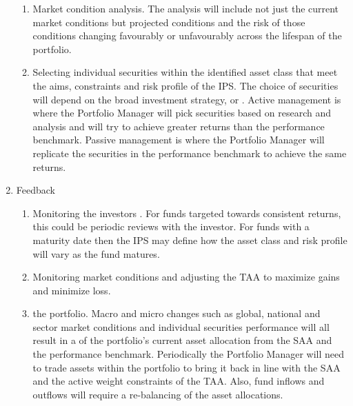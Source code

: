 \documentclass[oneside,12pt]{Classes/RoboticsLaTeX}
\begin{document}
\begin{enumerate}
\begin{enumerate}
    \item Market condition analysis. The analysis will include not just the current market conditions but projected conditions and the risk of those conditions changing favourably or unfavourably across the lifespan of the portfolio. 
    \item Selecting individual securities within the identified asset class that meet the aims, constraints and risk profile of the IPS. The choice of securities will depend on the broad investment strategy,  or . Active management is where the Portfolio Manager will pick securities based on research and analysis and will try to achieve greater returns than the performance benchmark. Passive management is where the Portfolio Manager will replicate the securities in the performance benchmark to achieve the same returns.
    \end{enumerate}
\item Feedback \citep[p.3]{BakerH.Kent2013PTaM}
    \begin{enumerate}
    \item Monitoring the investors . For funds targeted towards consistent returns, this could be periodic reviews with the investor. For funds with a maturity date then the IPS may define how the asset class and risk profile will vary as the fund matures.
    \item Monitoring market conditions and adjusting the TAA to maximize gains and minimize loss.
    \item {} the portfolio.  Macro and micro changes such as global, national and sector market conditions and individual securities performance will all result in a  of the portfolio’s current asset allocation from the SAA and the performance benchmark.  Periodically the Portfolio Manager will need to trade assets within the portfolio to bring it back in line with the SAA and the active weight constraints of the TAA.  Also, fund inflows and outflows will require a re-balancing of the asset allocations.
    \end{enumerate}
\end{enumerate}
\end{document}

